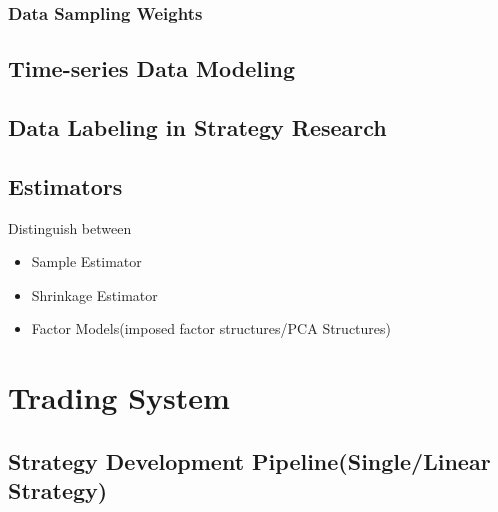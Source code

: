 \documentclass[11pt, openany]{book}              %
\begin{document}
\subsection{Data Sampling Weights}

\section{Time-series Data Modeling}

\section{Data Labeling in Strategy Research}

\section{Estimators}

Distinguish between
\begin{itemize}
	\item Sample Estimator
	\item Shrinkage Estimator
	\item Factor Models(imposed factor structures/PCA Structures)
\end{itemize}


\chapter{ Trading System }



\section{ Strategy Development Pipeline(Single/Linear Strategy) }
\end{document}
